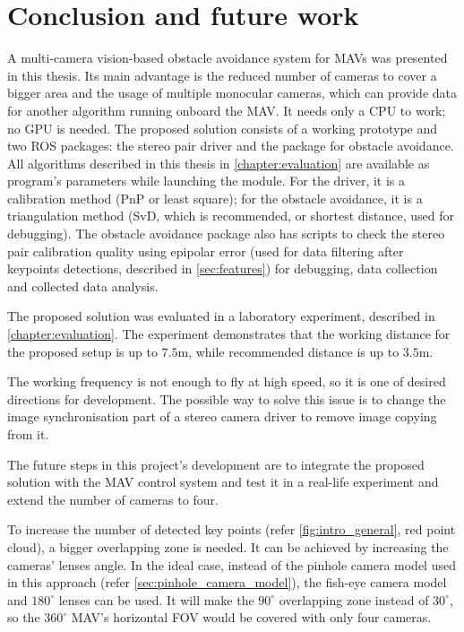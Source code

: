 \chapter{Conclusion and future work}
\label{chapter:conclusion}

A multi-camera vision-based obstacle avoidance system for MAVs was presented in this thesis. 
Its main advantage is the reduced number of cameras to cover a bigger area and the usage of multiple monocular cameras, which can provide data for another algorithm running onboard the MAV.
It needs only a CPU to work; no GPU is needed.
The proposed solution consists of a working prototype and two ROS packages: the stereo pair driver and the package for obstacle avoidance.
All algorithms described in this thesis in \autoref{chapter:evaluation} are available as program's parameters while launching the module.
For the driver, it is a calibration method (PnP or least square); for the obstacle avoidance, it is a triangulation method (SvD, which is recommended, or shortest distance, used for debugging).
The obstacle avoidance package also has scripts to check the stereo pair calibration quality using epipolar error (used for data filtering after keypoints detections, described in \autoref{sec:features}) for debugging, data collection and collected data analysis.

The proposed solution was evaluated in a laboratory experiment, described in \autoref{chapter:evaluation}. 
The experiment demonstrates that the working distance for the proposed setup is up to $7.5$m, while recommended distance is up to $3.5$m. 

The working frequency is not enough to fly at high speed, so it is one of desired directions for development.
The possible way to solve this issue is to change the image synchronisation part of a stereo camera driver to remove image copying from it.

The future steps in this project's development are to integrate the proposed solution with the MAV control system and test it in a real-life experiment and extend the number of cameras to four.

To increase the number of detected key points (refer \autoref{fig:intro_general}, red point cloud), a bigger overlapping zone is needed.
It can be achieved by increasing the cameras' lenses angle.
In the ideal case, instead of the pinhole camera model used in this approach (refer \autoref{sec:pinhole_camera_model}), the fish-eye camera model and $180^\circ$ lenses can be used.
It will make the $90^\circ$ overlapping zone instead of $30^\circ$, so the $360^\circ$ MAV's horizontal FOV would be covered with only four cameras.

